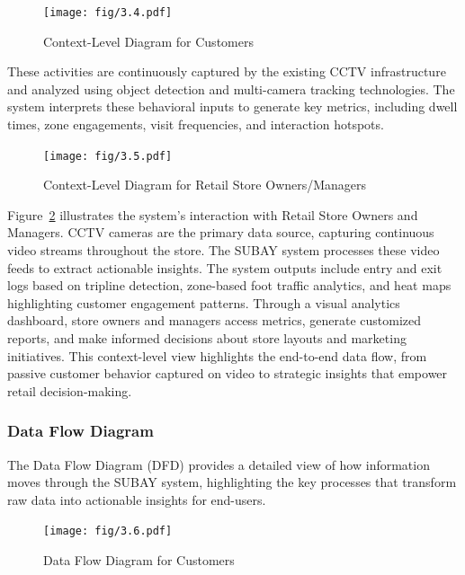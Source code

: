{\begin{figure}[H]
	\caption[Context-Level Diagram for Customers]{\newline \newline Context-Level Diagram for Customers}
	\centering
	\texttt{[image: fig/3.4.pdf]}
	\label{fig:3.4}
\end{figure}

These activities are continuously captured by the existing CCTV infrastructure and analyzed using object detection and multi-camera tracking technologies. The system interprets these behavioral inputs to generate key metrics, including dwell times, zone engagements, visit frequencies, and interaction hotspots. 

\begin{figure}[H]
	\caption[Context-Level Diagram for Retail Store Owners/Managers]{\newline \newline Context-Level Diagram for Retail Store Owners/Managers}
	\centering
	\texttt{[image: fig/3.5.pdf]}
	\label{fig:3.5}
\end{figure}

Figure~\ref{fig:3.5} illustrates the system’s interaction with Retail Store Owners and Managers. CCTV cameras are the primary data source, capturing continuous video streams throughout the store. The SUBAY system processes these video feeds to extract actionable insights. The system outputs include entry and exit logs based on tripline detection, zone-based foot traffic analytics, and heat maps highlighting customer engagement patterns. Through a visual analytics dashboard, store owners and managers access metrics, generate customized reports, and make informed decisions about store layouts and marketing initiatives. This context-level view highlights the end-to-end data flow, from passive customer behavior captured on video to strategic insights that empower retail decision-making.

\subsubsection{Data Flow Diagram}

The Data Flow Diagram (DFD) provides a detailed view of how information moves through the SUBAY system, highlighting the key processes that transform raw data into actionable insights for end-users.

\begin{figure}[H]
	\caption[Data Flow Diagram for Customers]{\newline \newline Data Flow Diagram for Customers}
	\centering
	\texttt{[image: fig/3.6.pdf]}
	\label{fig:3.6}
\end{figure}

}
